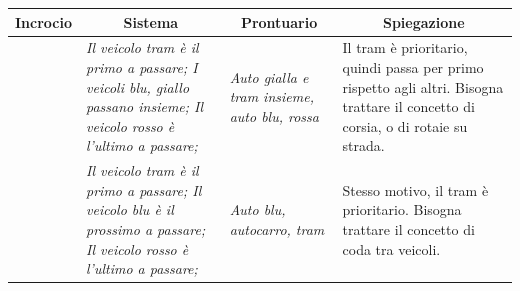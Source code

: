 \begin{center}
	\begin{tabularx}{\textwidth}{cXXX}
		\hline
		\textbf{Incrocio} & \multicolumn{1}{c}{\textbf{Sistema}} & \multicolumn{1}{c}{\textbf{Prontuario}} & \multicolumn{1}{c}{\textbf{Spiegazione}} \\ \hline
		\adjustbox{raise=-1.4cm}{15} & 	\textit{Il veicolo tram è il primo a passare; 
					I veicoli blu, giallo passano insieme;
					Il veicolo rosso è l'ultimo a passare;} & \textit{Auto gialla e tram insieme, auto blu, rossa} & Il tram è prioritario, quindi passa per primo rispetto agli altri. Bisogna trattare il concetto di corsia, o di rotaie su strada.  \\ \hline
		\adjustbox{raise=-1.3cm}{26} & 	\textit{Il veicolo tram è il primo a passare;
				Il veicolo blu è il prossimo a passare;
				Il veicolo rosso è l'ultimo a passare;} & \textit{Auto blu, autocarro, tram} & Stesso motivo, il tram è prioritario. Bisogna trattare il concetto di coda tra veicoli. \\ \hline
	\end{tabularx}
\end{center}
